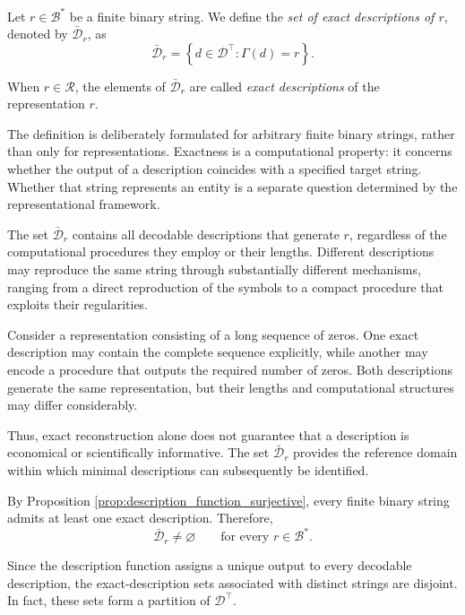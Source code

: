 \begin{definition}
\label{def:descriptions_for_representation}
Let $r\in\mathcal{B}^\ast$ be a finite binary string. We define the \emph{set of exact descriptions of $r$}, denoted by $\bar{\mathcal{D}}_r$, as
\[
\bar{\mathcal{D}}_r = \left\{d\in\mathcal{D}^\top : \Gamma(d)=r \right\}.
\]
\end{definition}

\noindent
When $r\in\mathcal{R}$, the elements of $\bar{\mathcal{D}}_r$ are called \emph{exact descriptions} of the representation $r$.

The definition is deliberately formulated for arbitrary finite binary strings, rather than only for representations. Exactness is a computational property: it concerns whether the output of a description coincides with a specified target string. Whether that string represents an entity is a separate question determined by the representational framework.

The set $\bar{\mathcal{D}}_r$ contains all decodable descriptions that generate $r$, regardless of the computational procedures they employ or their lengths. Different descriptions may reproduce the same string through substantially different mechanisms, ranging from a direct reproduction of the symbols to a compact procedure that exploits their regularities.

\begin{example}
Consider a representation consisting of a long sequence of zeros. One exact description may contain the complete sequence explicitly, while another may encode a procedure that outputs the required number of zeros. Both descriptions generate the same representation, but their lengths and computational structures may differ considerably.
\end{example}

Thus, exact reconstruction alone does not guarantee that a description is economical or scientifically informative. The set $\bar{\mathcal{D}}_r$ provides the reference domain within which minimal descriptions can subsequently be identified.

By Proposition \ref{prop:description_function_surjective}, every finite binary string admits at least one exact description. Therefore,
\[
\bar{\mathcal{D}}_r\neq\varnothing \qquad \text{for every }r\in\mathcal{B}^\ast.
\]

Since the description function assigns a unique output to every decodable description, the exact-description sets associated with distinct strings are disjoint. In fact, these sets form a partition of $\mathcal{D}^\top$.

